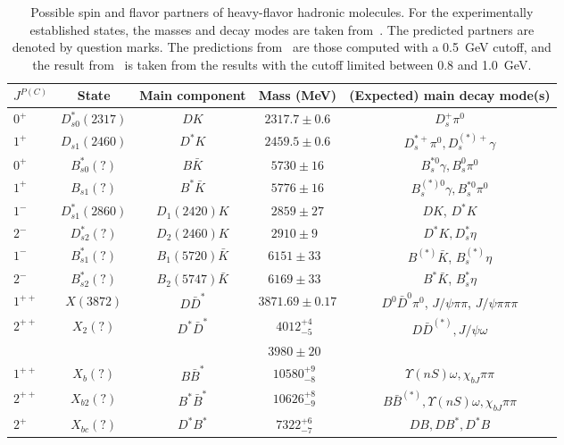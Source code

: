 \begin{table*}[tb]
\caption{\label{tab:partners} Possible spin and flavor partners of heavy-flavor
hadronic molecules. For the experimentally established states, the masses and
decay modes are taken from~\cite{Olive:2016xmw}. The predicted partners are
denoted by question marks.
The predictions from~\cite{Guo:2013sya} are those computed with a 0.5~GeV
cutoff, and the result from~\cite{Baru:2016iwj} is taken from the results with
the cutoff limited between 0.8 and 1.0~GeV.
}
\begin{ruledtabular}
\begin{tabular}{l c c c c }
        $J^{P(C)}$ & State & Main component & Mass (MeV) & (Expected) main decay
        mode(s) \\\hline
       $0^+$ & $D_{s0}^{*}(2317)$ & $DK$ & $2317.7\pm0.6$  & $D_s^+\pi^0$ \\
       $1^+$ & $D_{s1}(2460)$ & $D^*K$ & $2459.5\pm0.6$  &
$D_s^{*+}\pi^0,D_s^{(*)+}\gamma$ \\
       $0^+$ & $B_{s0}^{*}(?)$ & $B\bar K$ & $5730\pm16$  &
       $B_s^{*0}\gamma, B_s^0\pi^0$
       \\
       $1^+$ & $B_{s1}(?)$ & $B^*\bar K$ & $5776\pm16$  &
       $B_s^{(*)0}\gamma, B_s^{*0}\pi^0$
       \\\hline
       $1^-$ & $D_{s1}^*(2860)$ & $D_1(2420)K$ & $2859\pm27$ & $DK$, $D^*K$ \\
       $2^-$ & $D_{s2}^*(?)$ & $D_2(2460)K$ &
$2910\pm9$~\cite{Guo:2011dd} &
       $D^*K,D_s^*\eta$ \\
       $1^-$ & $B_{s1}^* (?)$ & $B_1(5720)\bar K$ &
$6151\pm33$~\cite{Guo:2011dd} & $B^{(*)} \bar K$, $B^{(*)}_s\eta $ \\
       $2^-$ & $B_{s2}^*(?)$ & $B_2(5747)\bar K$ &
$6169\pm33$~\cite{Guo:2011dd} &
       $B^{*} \bar K$, $B^{*}_s\eta$ \\
       \hline
       $1^{++}$ & $X(3872)$ & $D\bar D^*$ & $3871.69\pm0.17$ & $D^0\bar D^0\pi^0$,
       $J/\psi\pi\pi$, $J/\psi\pi\pi\pi$
       \\
       $2^{++}$ & $X_2 (?)$ & $D^*\bar D^*$ & $4012^{+4}_{-5}$~\cite{Guo:2013sya} & $D\bar
       D^{(*)}, J/\psi\omega$
       \\
        &      & &  $3980\pm20$~\cite{Baru:2016iwj}
         &
         \\
       $1^{++}$ & $X_b(?)$ & $B\bar B^*$ &  $10580^{+9}_{-8}$~\cite{Guo:2013sya} &
       $\Upsilon(nS)\omega,\chi_{bJ}\pi\pi$
       \\
       $2^{++}$ & $X_{b2}(?)$ & $B^*\bar B^*$ & $10626^{+8}_{-9}$~\cite{Guo:2013sya} &
       $B\bar B^{(*)},\Upsilon(nS)\omega,\chi_{bJ}\pi\pi$ \\
        $2^{+}$ & $X_{bc}(?)$ & $D^*B^*$& $7322^{+6}_{-7}$~\cite{Guo:2013sya} &
$DB,DB^*,D^*B$ \\
   \end{tabular}
\end{ruledtabular}
\end{table*}

